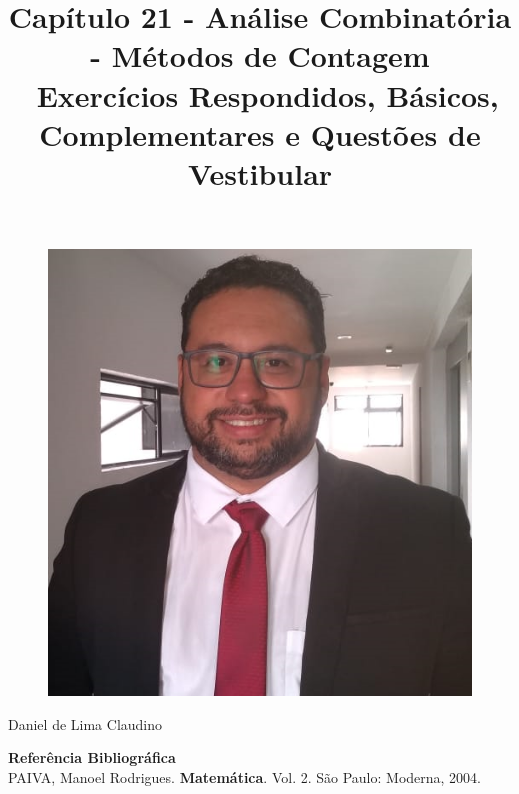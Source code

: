 \documentclass[a4paper,12pt]{article}
\begin{document}
\title{{\huge Capítulo 21 - Análise Combinatória - Métodos de Contagem} \\ 
  \, \linebreak \linebreak \linebreak Exercícios Respondidos, Básicos, Complementares e Questões de Vestibular
}
\date{}

\maketitle 

\begin{figure}[htb]
 \centering
 \includegraphics[scale=0.4]{../../imagens/FOTO-PERFIL-DANIEL-CLAUDINO-2020.png}
\end{figure}

\begin{center}
  \begin{large}
    {\huge Daniel de Lima Claudino \linebreak \linebreak} 
  \end{large}
\end{center}

\begin{flushright}
  \begin{small}
    {\large \textbf{Referência Bibliográfica}\\PAIVA, Manoel Rodrigues. \textbf{Matemática}. Vol. 2. São Paulo: Moderna, 2004.} 
  \end{small}
\end{flushright}
\end{document}
